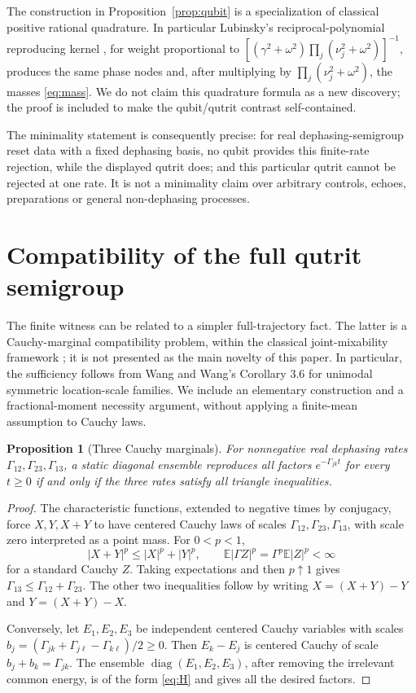 \documentclass[11pt,a4paper]{article}
\newtheorem{proposition}[theorem]{Proposition}
\newcommand{\E}{\mathbb E}
\newcommand{\diag}{\operatorname{diag}}
\begin{document}
The construction in Proposition~\ref{prop:qubit} is a specialization
of classical positive rational quadrature. In particular Lubinsky's
reciprocal-polynomial reproducing kernel \cite[equations (1.11)--(1.12)]{lubinsky},
for weight proportional to
$[(\gamma^2+\omega^2)\prod_j(\nu_j^2+\omega^2)]^{-1}$, produces
the same phase nodes and, after multiplying by
$\prod_j(\nu_j^2+\omega^2)$, the masses \eqref{eq:mass}.
We do not claim this quadrature formula as a new discovery; the proof
is included to make the qubit/qutrit contrast self-contained.

The minimality statement is consequently precise: for real
dephasing-semigroup reset data with a fixed dephasing basis, no qubit
provides this finite-rate rejection, while the displayed qutrit does;
and this particular qutrit cannot be rejected at one rate. It is not
a minimality claim over arbitrary controls, echoes, preparations or
general non-dephasing processes.

\section{Compatibility of the full qutrit semigroup}
The finite witness can be related to a simpler full-trajectory fact.
The latter is a Cauchy-marginal compatibility problem, within the
classical joint-mixability framework \cite{wang}; it is not presented
as the main novelty of this paper.
In particular, the sufficiency follows from Wang and Wang's
Corollary 3.6 for unimodal symmetric location-scale families. We
include an elementary construction and a fractional-moment necessity
argument, without applying a finite-mean assumption to Cauchy laws.

\begin{proposition}[Three Cauchy marginals]
For nonnegative real dephasing rates
$\Gamma_{12},\Gamma_{23},\Gamma_{13}$, a static diagonal ensemble
reproduces all factors $e^{-\Gamma_{jk}t}$ for every $t\geq0$ if
and only if the three rates satisfy all triangle inequalities.
\end{proposition}
\begin{proof}
The characteristic functions, extended to negative times by conjugacy,
force $X,Y,X+Y$ to have centered Cauchy laws of scales
$\Gamma_{12},\Gamma_{23},\Gamma_{13}$, with scale zero interpreted
as a point mass. For $0<p<1$,
\[
 |X+Y|^p\leq|X|^p+|Y|^p,
 \qquad \E|\Gamma Z|^p=\Gamma^p\E|Z|^p<\infty
\]
for a standard Cauchy $Z$. Taking expectations and then $p\uparrow1$
gives $\Gamma_{13}\leq\Gamma_{12}+\Gamma_{23}$. The other two
inequalities follow by writing $X=(X+Y)-Y$ and $Y=(X+Y)-X$.

Conversely, let $E_1,E_2,E_3$ be independent centered Cauchy
variables with scales
$b_j=(\Gamma_{jk}+\Gamma_{j\ell}-\Gamma_{k\ell})/2\geq0$.
Then $E_k-E_j$ is centered Cauchy of scale
$b_j+b_k=\Gamma_{jk}$. The ensemble $\diag(E_1,E_2,E_3)$,
after removing the irrelevant common energy, is of the form
\eqref{eq:H} and gives all the desired factors.
\end{proof}
\end{document}
